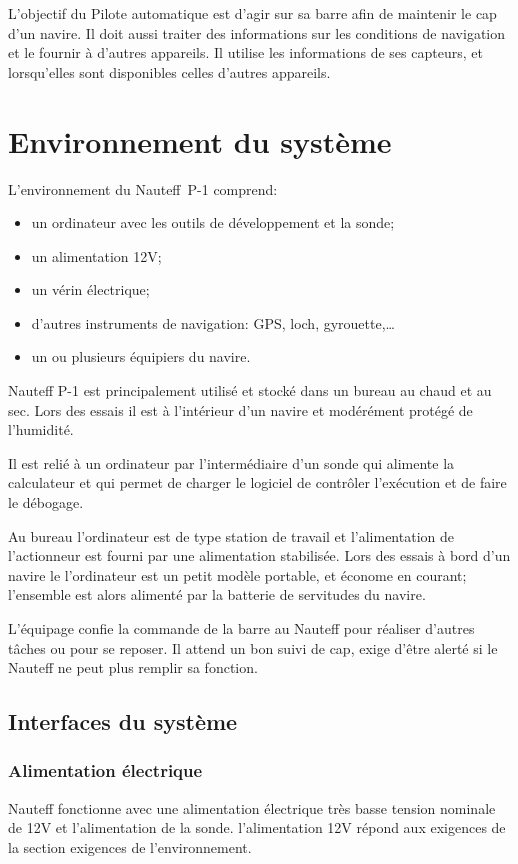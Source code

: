 \documentclass[a4paper,11pt]{report}
\begin{document}
L'objectif du Pilote automatique est d'agir sur sa barre afin de maintenir
le cap d'un navire. Il doit aussi traiter des informations sur les conditions
de navigation et le fournir à d'autres appareils.
Il utilise les informations de ses capteurs, et lorsqu'elles
sont disponibles celles d'autres appareils.

\section{Environnement du système}
L'environnement du Nauteff~P-1 comprend:
\begin{itemize}
	\item un ordinateur avec les outils de développement et la sonde;
	\item un alimentation 12V;
	\item un vérin électrique;
	\item d'autres instruments de navigation: GPS, loch, gyrouette,\dots
	\item un ou plusieurs équipiers du navire.
\end{itemize}

Nauteff P-1 est principalement utilisé et stocké dans un bureau
au chaud et au sec. Lors des essais il est à l'intérieur d'un navire
et modérément protégé de l'humidité.

Il est relié à un ordinateur par l'intermédiaire d'un sonde qui
alimente la calculateur et qui permet de charger le logiciel
de contrôler l'exécution et de faire le débogage.

Au bureau l'ordinateur est de type station de travail et l'alimentation
de l'actionneur est fourni par une alimentation stabilisée.
Lors des essais à bord d'un navire le l'ordinateur est un petit modèle
portable, et économe en courant; l'ensemble est alors alimenté par
la batterie de servitudes du navire.

L'équipage confie la commande de la barre au Nauteff pour réaliser d'autres
tâches ou pour se reposer. Il attend un bon suivi de cap, exige d'être
alerté si le Nauteff ne peut plus remplir sa fonction.

\subsection{Interfaces du système}

\subsubsection{Alimentation électrique}
Nauteff fonctionne avec une alimentation électrique
très basse tension nominale de 12V et l'alimentation de la sonde.
l'alimentation 12V répond aux exigences de la section exigences de l'environnement.
\end{document}
